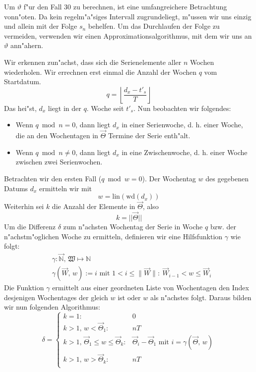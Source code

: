 \documentclass[a4paper]{article}
\newcommand*{\wdf}{\mathrm{wd}}
\newcommand*{\linf}{\mathrm{lin}}
\newcommand*{\wkdays}{\mathfrak{W}}
\numberwithin{equation}{section}
\begin{document}
Um $\vartheta$ f"ur den Fall 30 zu berechnen, ist eine umfangreichere
Betrachtung vonn"oten. Da kein regelm"a"siges Intervall zugrundeliegt, m"ussen
wir uns einzig und allein mit der Folge $s_n$ behelfen. Um das Durchlaufen der
Folge zu vermeiden, verwenden wir einen Approximationsalgorithmus, mit dem wir
uns an $\vartheta$ ann"ahern.

Wir erkennen zun"achst, dass sich die Serienelemente aller $n$ Wochen
wiederholen. Wir errechnen erst einmal die Anzahl der Wochen $q$ vom Startdatum.
\begin{equation}q = \left\lfloor\frac{d_x - t'_s}{T}\right\rfloor\end{equation}
Das hei"st, $d_x$ liegt in der $q$. Woche seit $t'_s$. Nun beobachten wir
folgendes:
\begin{itemize}
  \item Wenn $q \bmod n = 0$, dann liegt $d_x$ in einer Serienwoche, d. h. einer
    Woche, die an den Wochentagen in $\vec{\Theta}$ Termine der Serie enth"alt.
  \item Wenn $q \bmod n \ne 0$, dann liegt $d_x$ in eine Zwischenwoche, d. h.
    einer Woche zwischen zwei Serienwochen.
\end{itemize}

\noindent Betrachten wir den ersten Fall ($q \bmod w = 0$). Der Wochentag $w$
des gegebenen Datums $d_x$ ermitteln wir mit
\begin{equation}w = \linf(\wdf(d_x))\end{equation}
Weiterhin sei $k$ die Anzahl der Elemente in $\vec{\Theta}$, also
\begin{equation}k = ||\vec{\Theta}||\end{equation}
Um die Differenz $\delta$ zum n"achsten Wochentag der Serie in Woche $q$ bzw.
der n"achstm"oglichen Woche zu ermitteln, definieren wir eine Hilfsfunktion
$\gamma$ wie folgt:
\begin{equation}
\begin{split}
  & \gamma : \vec{\mathbb{N}},\,\wkdays \mapsto \mathbb{N} \\
  & \gamma(\vec{W},\,w) := i \textrm{ mit } 1 < i \le \|\vec{W}\| :
    \ \vec{W}_{i-1} < w \le \vec{W}_i
\end{split}
\end{equation}
Die Funktion $\gamma$ ermittelt aus einer geordneten Liste von Wochentagen den
Index desjenigen Wochentages der gleich $w$ ist oder $w$ als n"achstes folgt.
Daraus bilden wir nun folgenden Algorithmus:
\begin{equation}
  \delta = \left\{\begin{array}{ll}
      k = 1 : & 0 \\
      k > 1,\,w < \vec{\Theta}_1: & nT \\
      k > 1,\,\vec{\Theta}_1 \le w \le \vec{\Theta}_k: &
        \vec{\Theta}_i - \vec{\Theta}_{1} \textrm{ mit }
        i = \gamma(\vec{\Theta},\,w) \\
      k > 1,\,w > \vec{\Theta}_k: & nT \\
    \end{array}\right.
\end{equation}
\end{document}
